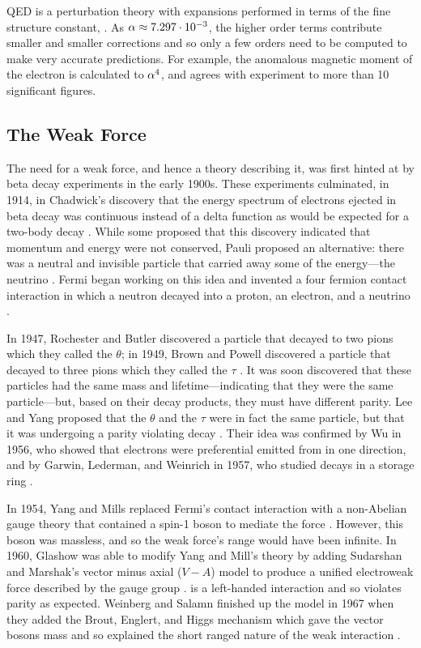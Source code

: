 QED is a perturbation theory with expansions performed in terms of the fine
structure constant, \fsc. As $\alpha \approx 7.297 \cdot 10^{-3}$, the higher
order terms contribute smaller and smaller corrections and so only a few orders
need to be computed to make very accurate predictions. For example, the
anomalous magnetic moment of the electron is calculated to $\alpha^{4}$, and
agrees with experiment to more than 10 significant figures.

\subsection{The Weak Force}
\label{subsection:weak_force}

The need for a weak force, and hence a theory describing it, was first hinted
at by beta decay experiments in the early 1900s. These experiments culminated,
in 1914, in Chadwick's discovery that the energy spectrum of electrons ejected
in beta decay was continuous instead of a delta function as would be expected
for a two-body decay \cite{chadwick1914}. While some proposed that this
discovery indicated that momentum and energy were not conserved, Pauli proposed
an alternative: there was a neutral and invisible particle that carried away
some of the energy---the neutrino \cite{pauli1930}. Fermi began working on this
idea and invented a four fermion contact interaction in which a neutron decayed
into a proton, an electron, and a neutrino \cite{fermi1934}.

In 1947, Rochester and Butler discovered a particle that decayed to two pions
which they called the $\theta$; in 1949, Brown and Powell discovered a particle
that decayed to three pions which they called the $\tau$
\cite{Rochester1947}\cite{brown1949}. It was soon discovered that these
particles had the same mass and lifetime---indicating that they were the same
particle---but, based on their decay products, they must have different parity.
Lee and Yang proposed that the $\theta$ and the $\tau$ were in fact the same
particle, but that it was undergoing a parity violating decay \cite{lee1956}.
Their idea was confirmed by Wu in 1956, who showed that electrons were
preferential emitted from \cobaltsixty in one direction, and by Garwin,
Lederman, and Weinrich in 1957, who studied \pitomunu decays in a storage ring
\cite{wu1956}\cite{garwin1957}.

In 1954, Yang and Mills replaced Fermi's contact interaction with a non-Abelian
gauge theory that contained a spin-1 boson to mediate the force
\cite{yang1954}. However, this boson was massless, and so the weak force's
range would have been infinite. In 1960, Glashow was able to modify Yang and
Mill's theory by adding Sudarshan and Marshak's vector minus axial ($V-A$)
model to produce a unified electroweak force described by the \SUtwoUone gauge
group \cite{glashow1961}\cite{sudarshan1958}. \SUtwo is a left-handed
interaction and so violates parity as expected. Weinberg and Salamn finished up
the model in 1967 when they added the Brout, Englert, and Higgs mechanism which
gave the vector bosons mass and so explained the short ranged nature of the
weak interaction
\cite{weinberg1967}\cite{salam1968}\cite{englert1964}\cite{higgs1964}.

